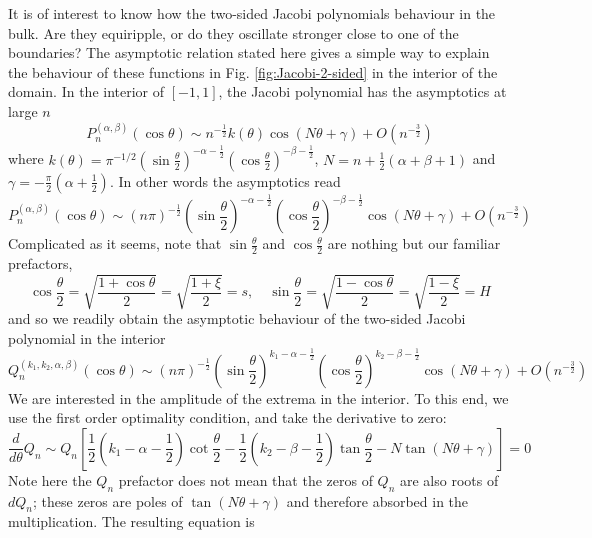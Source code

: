 It is of interest to know how the two-sided Jacobi polynomials behaviour in the bulk. Are they equiripple, or do they oscillate stronger close to one of the boundaries? The asymptotic relation stated here gives a simple way to explain the behaviour of these functions in Fig. \ref{fig:Jacobi-2-sided} in the interior of the domain.
In the interior of $[-1, 1]$, the Jacobi polynomial has the asymptotics at large $n$ \citep{szego_orthogonal_1939}
%
\begin{equation}\label{eqn:asymp-Jacobi-int}
    P_n^{(\alpha, \beta)}(\cos\theta) \sim n^{-\frac{1}{2}} k(\theta) \cos(N\theta + \gamma) + O\left(n^{-\frac{3}{2}}\right)
\end{equation}
where $k(\theta) = \pi^{-1/2} (\sin \frac{\theta}{2})^{-\alpha - \frac{1}{2}} (\cos \frac{\theta}{2})^{-\beta - \frac{1}{2}}$, $N = n + \frac{1}{2}(\alpha + \beta + 1)$ and $\gamma = -\frac{\pi}{2}(\alpha + \frac{1}{2})$. In other words the asymptotics read
%
\[
    P_n^{(\alpha, \beta)}(\cos\theta) \sim (n\pi)^{-\frac{1}{2}} (\sin \frac{\theta}{2})^{-\alpha - \frac{1}{2}} (\cos \frac{\theta}{2})^{-\beta - \frac{1}{2}} \cos\left(N\theta + \gamma\right) + O\left(n^{-\frac{3}{2}}\right)
\]
%
Complicated as it seems, note that $\sin\frac{\theta}{2}$ and $\cos\frac{\theta}{2}$ are nothing but our familiar prefactors,
%
\[
    \cos \frac{\theta}{2} = \sqrt{\frac{1 + \cos\theta}{2}} = \sqrt{\frac{1 + \xi}{2}} = s,\quad 
    \sin \frac{\theta}{2} = \sqrt{\frac{1 - \cos\theta}{2}} = \sqrt{\frac{1 - \xi}{2}} = H
\]
%
and so we readily obtain the asymptotic behaviour of the two-sided Jacobi polynomial in the interior
%
\begin{equation}
    Q_n^{(k_1, k_2, \alpha, \beta)}(\cos\theta) \sim (n\pi)^{-\frac{1}{2}} (\sin \frac{\theta}{2})^{k_1 -\alpha - \frac{1}{2}} (\cos \frac{\theta}{2})^{k_2 -\beta - \frac{1}{2}} \cos\left(N\theta + \gamma\right) + O\left(n^{-\frac{3}{2}}\right)
\end{equation}
%
We are interested in the amplitude of the extrema in the interior. To this end, we use the first order optimality condition, and take the derivative to zero:
%
\[
    \frac{d}{d\theta} Q_n \sim Q_n \left[\frac{1}{2} \left(k_1 - \alpha - \frac{1}{2}\right) \cot\frac{\theta}{2} - \frac{1}{2} \left(k_2 - \beta - \frac{1}{2}\right) \tan \frac{\theta}{2} - N \tan \left(N\theta + \gamma\right)\right] = 0
\]
%
Note here the $Q_n$ prefactor does not mean that the zeros of $Q_n$ are also roots of $dQ_n$; these zeros are poles of $\tan(N\theta + \gamma)$ and therefore absorbed in the multiplication. The resulting equation is
